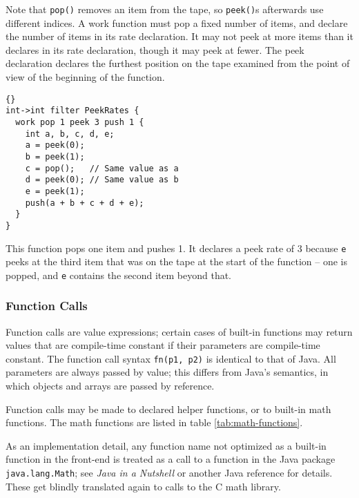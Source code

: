 \documentclass[11pt]{article}
\begin{document}
Note that \lstinline|pop()| removes an item from the tape, so
\lstinline|peek()|s afterwards use different indices.  A work function
must pop a fixed number of items, and declare the number of items in
its rate declaration.  It may not peek at more items than it declares
in its rate declaration, though it may peek at fewer.  The peek
declaration declares the furthest position on the tape examined from
the point of view of the beginning of the function.

\begin{lstlisting}{}
int->int filter PeekRates {
  work pop 1 peek 3 push 1 {
    int a, b, c, d, e;
    a = peek(0);
    b = peek(1);
    c = pop();   // Same value as a
    d = peek(0); // Same value as b
    e = peek(1);
    push(a + b + c + d + e);
  }
}
\end{lstlisting}

This function pops one item and pushes 1.  It declares a peek rate of
3 because \lstinline|e| peeks at the third item that was on the tape
at the start of the function -- one is popped, and \lstinline|e|
contains the second item beyond that.

\subsubsection{Function Calls}
\label{sec:expr-funcall}

Function calls are value expressions; certain cases of built-in
functions may return values that are compile-time constant if their
parameters are compile-time constant.  The function call syntax
\lstinline|fn(p1, p2)| is identical to that of Java.  All parameters are
always passed by value; this differs from Java's semantics, in which
objects and arrays are passed by reference.

Function calls may be made to declared helper functions, or to
built-in math functions.  The math functions are listed in table
\ref{tab:math-functions}.

\begin{note}
As an implementation detail, any function name not optimized as a
built-in function in the front-end is treated as a call to a function
in the Java package \lstinline|java.lang.Math|; see \emph{Java in a
  Nutshell} or another Java reference for details.  These get blindly
translated again to calls to the C math library.
\end{note}
\end{document}
